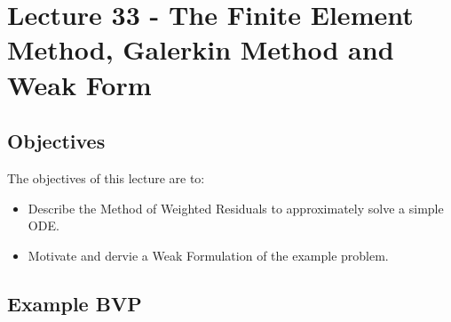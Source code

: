 \chapter{Lecture 33 - The Finite Element Method, Galerkin Method and Weak Form}
\label{ch:lec33n}
\section{Objectives}
The objectives of this lecture are to:
\begin{itemize}
\item Describe the Method of Weighted Residuals to approximately solve a simple ODE.
\item Motivate and dervie a Weak Formulation of the example problem.
\end{itemize}
\setcounter{lstannotation}{0}

\section{Example BVP}
